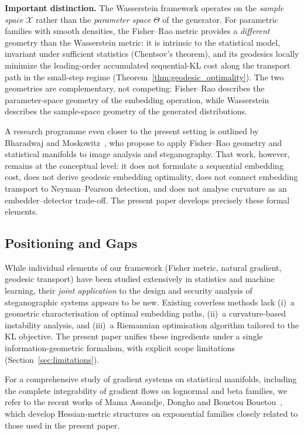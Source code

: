 \documentclass[a4paper,fleqn]{cas-dc}
\begin{document}
\textbf{Important distinction.}
The Wasserstein framework operates on the \emph{sample space}
$\mathcal{X}$ rather than the \emph{parameter space} $\Theta$ of the
generator.
For parametric families with smooth densities, the Fisher--Rao metric
provides a \emph{different} geometry than the Wasserstein metric: it is
intrinsic to the statistical model, invariant under sufficient
statistics (Chentsov's theorem), and its geodesics locally minimize the leading-order accumulated sequential-KL cost along the transport path in the small-step regime (Theorem~\ref{thm:geodesic_optimality}).
The two geometries are complementary, not competing: Fisher--Rao
describes the parameter-space geometry of the embedding operation,
while Wasserstein describes the sample-space geometry of the generated
distributions.

A research programme even closer to the present setting is outlined by
Bharadwaj and Moskowitz~\cite{moskowitz2018assuring}, who propose to apply
Fisher--Rao geometry and statistical manifolds to image analysis and
steganography.
That work, however, remains at the conceptual level: it does not formulate a
sequential embedding cost, does not derive geodesic embedding optimality, does
not connect embedding transport to Neyman--Pearson detection, and does not
analyse curvature as an embedder--detector trade-off.
The present paper develops precisely these formal elements.

\subsection{Positioning and Gaps}

While individual elements of our framework (Fisher metric, natural
gradient, geodesic transport) have been studied extensively in
statistics and machine learning, their \emph{joint application} to the
design and security analysis of steganographic systems appears to be new.
Existing coverless methods lack (i)~a geometric characterisation of
optimal embedding paths, (ii)~a curvature-based instability analysis,
and (iii)~a Riemannian optimisation algorithm tailored to the KL
objective.
The present paper unifies these ingredients under a single
information-geometric formalism, with explicit scope limitations
(Section~\ref{sec:limitations}).

For a comprehensive study of gradient systems on statistical manifolds, including the complete integrability of gradient flows on lognormal
and beta families, we refer to the recent works of Mama Assandje,
Dongho and Bouetou Bouetou~\cite{mama2023chaos,mama2024infogeom}, which
develop Hessian-metric structures on exponential families closely related
to those used in the present paper.
\end{document}
